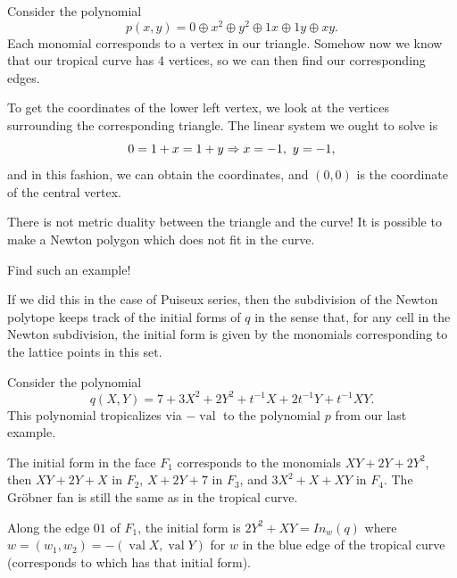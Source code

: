 \documentclass[12pt]{memoir}
\DeclareMathOperator{\val}{val}
\theoremstyle{definition}
\begin{document}
\begin{Ex}
    Consider the polynomial
    $$p(x,y)=0\oplus x^2\oplus y^2\oplus 1x\oplus 1y\oplus xy.$$
    Each monomial corresponds to a vertex in our triangle. Somehow now we know that our tropical curve has 4 vertices, so we can then find our corresponding edges.\par 
    To get the coordinates of the lower left vertex, we look at the vertices surrounding the corresponding triangle. The linear system we ought to solve is 
    $$0=1+x=1+y\To x=-1,\ y=-1,$$
    and in this fashion, we can obtain the coordinates, and  $(0,0)$ is the coordinate of the central vertex.
\end{Ex}

\begin{Rmk}
There is not metric duality between the triangle and the curve! It is possible to make a Newton polygon which does not fit in the curve.
\end{Rmk}

\begin{Ej}
Find such an example!
\end{Ej}

If we did this in the case of Puiseux series, then the subdivision of the Newton polytope keeps track of the initial forms of $q$ in the sense that, for any cell in the Newton subdivision, the initial form is given by the monomials corresponding to the lattice points in this set.

\begin{Ex}
    Consider the polynomial 
    $$q(X,Y)=7+3X^2+2Y^2+t^{-1}X+2t^{-1}Y+t^{-1}XY.$$
    This polynomial tropicalizes via $-\val$ to the polynomial $p$ from our last example.\par {}\par 
    The initial form in the face $F_1$ corresponds to the monomials $XY+2Y+2Y^2$, then $XY+2Y+X$ in $F_2$, $X+2Y+7$ in $F_3$, and $3X^2+X+XY$ in $F_4$. The Gr\"obner fan is still the same as in the tropical curve.\par 
    Along the edge $01$ of $F_1$, the initial form is $2Y^2+XY=In_w(q)$ where $w=(w_1,w_2)=-(\val X,\val Y)$ for $w$ in the blue edge of the tropical curve (corresponds to  which has that initial form). 
\end{Ex}
\end{document}
